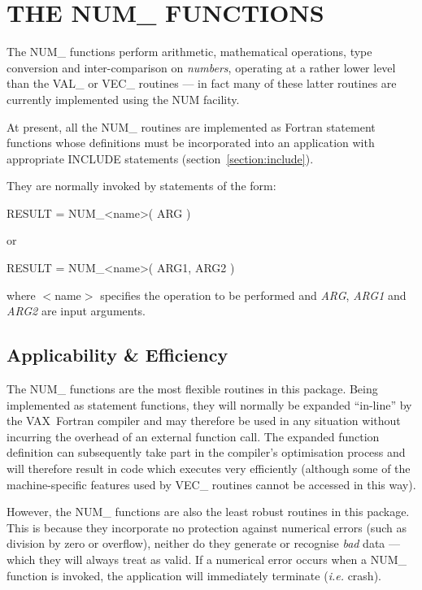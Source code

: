 \documentclass[11pt,nolof]{starlink}
\providecommand{\name}[1]{#1}
\providecommand{\fortvar}[1]{\emph{#1}}
\begin{document}
\section{THE NUM\_ FUNCTIONS}

\label{section:num}

The \name{NUM\_} functions perform arithmetic, mathematical operations, type
conversion and inter-comparison on \emph{numbers}, operating at a rather
lower level than the \name{VAL\_} or \name{VEC\_} routines --- in fact many
of these latter routines are currently implemented using the \name{NUM}
facility.

At present, all the \name{NUM\_} routines are implemented as Fortran
statement functions whose definitions must be incorporated into an
application with appropriate \name{INCLUDE} statements
(section~\ref{section:include}).

They are normally invoked by statements of the form:

\begin{terminalv}
RESULT = NUM_<name>( ARG )
\end{terminalv}
or
\begin{terminalv}
RESULT = NUM_<name>( ARG1, ARG2 )
\end{terminalv}

where \name{$<$name$>$} specifies the operation to be performed and
\fortvar{ARG}, \fortvar{ARG1} and \fortvar{ARG2} are input arguments.

\subsection{Applicability \& Efficiency}

The \name{NUM\_} functions are the most flexible routines in this package.
Being implemented as statement functions, they will normally be expanded
``in-line'' by the \name{VAX}~Fortran compiler and may therefore be used in
any situation without incurring the overhead of an external function call.
The expanded function definition can subsequently take part in the
compiler's optimisation process and will therefore result in code which
executes very efficiently (although some of the machine-specific features
used by \name{VEC\_} routines cannot be accessed in this way).

However, the \name{NUM\_} functions are also the least robust routines in
this package.
This is because they incorporate no protection against numerical errors
(such as division by zero or overflow), neither do they generate or
recognise \emph{bad} data --- which they will always treat as valid.
If a numerical error occurs when a \name{NUM\_} function is invoked, the
application will immediately terminate (\emph{i.e.} crash).
\end{document}
